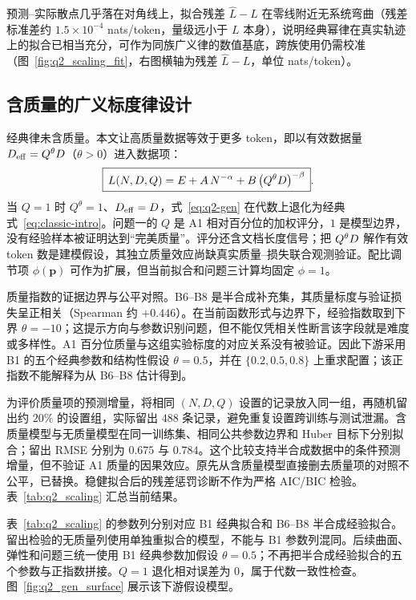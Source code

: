 预测--实际散点几乎落在对角线上，拟合残差 $\hat L-L$ 在零线附近无系统弯曲（残差标准差约 $1.5\times10^{-4}$ nats/token，量级远小于 $L$ 本身），说明经典幂律在真实轨迹上的拟合已相当充分，可作为同族广义律的数值基底，跨族使用仍需校准（图~\ref{fig:q2_scaling_fit}，右图横轴为残差 $\hat L-L$，单位 nats/token）。

\subsection{含质量的广义标度律设计}
经典律未含质量。本文让高质量数据等效于更多 token，即以有效数据量 $D_{\mathrm{eff}}=Q^{\theta}D$（$\theta>0$）进入数据项：
\begin{equation}
\boxed{\,L(N,D,Q)=E+A\,N^{-\alpha}+B\,\bigl(Q^{\theta}D\bigr)^{-\beta}\,}.
\label{eq:q2-gen}
\end{equation}
当 $Q=1$ 时 $Q^{\theta}=1$、$D_{\mathrm{eff}}=D$，式~\eqref{eq:q2-gen} 在代数上退化为经典式~\eqref{eq:classic-intro}。问题一的 $Q$ 是 A1 相对百分位的加权评分，$1$ 是模型边界，没有经验样本被证明达到“完美质量”。评分还含文档长度信号；把 $Q^{\theta}D$ 解作有效 token 数是建模假设，其独立质量效应尚缺真实质量--损失联合观测验证。配比调节项 $\phi(\bm p)$ 可作为扩展，但当前拟合和问题三计算均固定 $\phi=1$。

质量指数的证据边界与公平对照。B6--B8 是半合成补充集，其质量标度与验证损失呈正相关（Spearman 约 $+0.446$）。在当前函数形式与边界下，经验指数取到下界 $\theta=-10$；这提示方向与参数识别问题，但不能仅凭相关性断言该字段就是难度或多样性。A1 百分位质量与这组实验标度的对应关系没有被验证。因此下游采用 B1 的五个经典参数和结构性假设 $\theta=0.5$，并在 $\{0.2,0.5,0.8\}$ 上重求配置；该正指数不能解释为从 B6--B8 估计得到。

为评价质量项的预测增量，将相同 $(N,D,Q)$ 设置的记录放入同一组，再随机留出约 $20\%$ 的设置组，实际留出 $488$ 条记录，避免重复设置跨训练与测试泄漏。含质量模型与无质量模型在同一训练集、相同公共参数边界和 Huber 目标下分别拟合；留出 RMSE 分别为 $0.675$ 与 $0.784$。这个比较支持半合成数据中的条件预测增量，但不验证 A1 质量的因果效应。原先从含质量模型直接删去质量项的对照不公平，已替换。稳健拟合后的残差惩罚诊断不作为严格 AIC/BIC 检验。表~\ref{tab:q2_scaling} 汇总当前结果。



表~\ref{tab:q2_scaling} 的参数列分别对应 B1 经典拟合和 B6--B8 半合成经验拟合。留出检验的无质量列使用单独重拟合的模型，不能与 B1 参数列混同。后续曲面、弹性和问题三统一使用 B1 经典参数加假设 $\theta=0.5$；不再把半合成经验拟合的五个参数与正指数拼接。$Q=1$ 退化相对误差为 $0$，属于代数一致性检查。图~\ref{fig:q2_gen_surface} 展示该下游假设模型。

